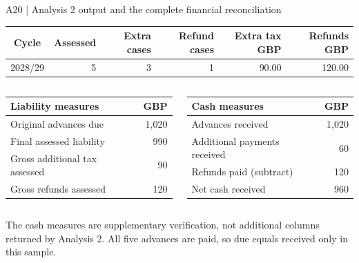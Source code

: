 \begin{frame}{A20 | Analysis 2 output and the complete financial reconciliation}
\small
\begin{tabular}{@{}crrrrr@{}}\toprule
Cycle & Assessed & Extra cases & Refund cases & Extra tax GBP & Refunds GBP\\\midrule
2028/29 & 5 & 3 & 1 & 90.00 & 120.00\\\bottomrule
\end{tabular}\par
\medskip
\begin{columns}[T,onlytextwidth]
\begin{tabular}{@{}lr@{}}\toprule
\textbf{Liability measures} & \textbf{GBP}\\\midrule
Original advances due & 1,020\\
Final assessed liability & 990\\
Gross additional tax assessed & 90\\
Gross refunds assessed & 120\\\bottomrule
\end{tabular}
\begin{tabular}{@{}lr@{}}\toprule
\textbf{Cash measures} & \textbf{GBP}\\\midrule
Advances received & 1,020\\
Additional payments received & 60\\
Refunds paid (subtract) & 120\\
Net cash received & 960\\\bottomrule
\end{tabular}
\end{columns}
{\small The cash measures are supplementary verification, not additional columns returned by Analysis 2. All five advances are paid, so due equals received only in this sample.}
\end{frame}

